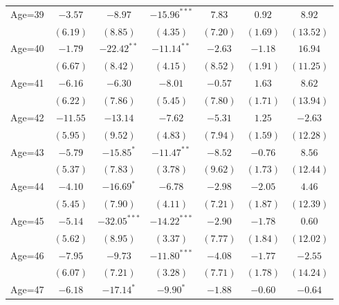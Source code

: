\documentclass[fullpage]{paper}
\begin{document}
\begin{center}
\begin{longtable}{l c c c c c c }
Age=39      & $-3.57$       & $-8.97$        & $-15.96^{***}$ & $7.83$        & $0.92$        & $8.92$        \\
            & $(6.19)$      & $(8.85)$       & $(4.35)$       & $(7.20)$      & $(1.69)$      & $(13.52)$     \\
Age=40      & $-1.79$       & $-22.42^{**}$  & $-11.14^{**}$  & $-2.63$       & $-1.18$       & $16.94$       \\
            & $(6.67)$      & $(8.42)$       & $(4.15)$       & $(8.52)$      & $(1.91)$      & $(11.25)$     \\
Age=41      & $-6.16$       & $-6.30$        & $-8.01$        & $-0.57$       & $1.63$        & $8.62$        \\
            & $(6.22)$      & $(7.86)$       & $(5.45)$       & $(7.80)$      & $(1.71)$      & $(13.94)$     \\
Age=42      & $-11.55$      & $-13.14$       & $-7.62$        & $-5.31$       & $1.25$        & $-2.63$       \\
            & $(5.95)$      & $(9.52)$       & $(4.83)$       & $(7.94)$      & $(1.59)$      & $(12.28)$     \\
Age=43      & $-5.79$       & $-15.85^{*}$   & $-11.47^{**}$  & $-8.52$       & $-0.76$       & $8.56$        \\
            & $(5.37)$      & $(7.83)$       & $(3.78)$       & $(9.62)$      & $(1.73)$      & $(12.44)$     \\
Age=44      & $-4.10$       & $-16.69^{*}$   & $-6.78$        & $-2.98$       & $-2.05$       & $4.46$        \\
            & $(5.45)$      & $(7.90)$       & $(4.11)$       & $(7.21)$      & $(1.87)$      & $(12.39)$     \\
Age=45      & $-5.14$       & $-32.05^{***}$ & $-14.22^{***}$ & $-2.90$       & $-1.78$       & $0.60$        \\
            & $(5.62)$      & $(8.95)$       & $(3.37)$       & $(7.77)$      & $(1.84)$      & $(12.02)$     \\
Age=46      & $-7.95$       & $-9.73$        & $-11.80^{***}$ & $-4.08$       & $-1.77$       & $-2.55$       \\
            & $(6.07)$      & $(7.21)$       & $(3.28)$       & $(7.71)$      & $(1.78)$      & $(14.24)$     \\
Age=47      & $-6.18$       & $-17.14^{*}$   & $-9.90^{*}$    & $-1.88$       & $-0.60$       & $-0.64$       \\

\end{longtable}
\end{center}
\end{document}
